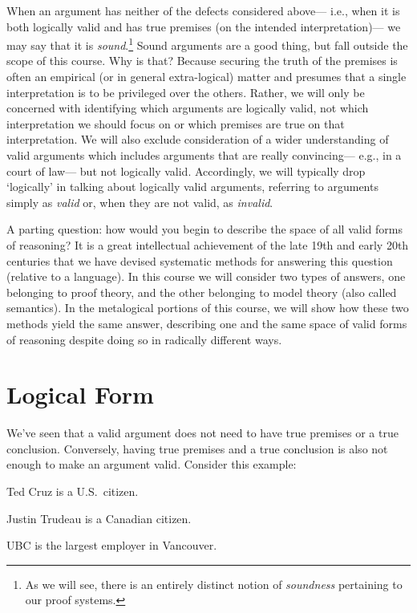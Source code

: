 When an argument has neither of the defects considered above--- i.e., when it is both logically valid and has true premises (on the intended interpretation)--- we may say that it is \textit{sound}.\footnote{As we will see, there is an entirely distinct notion of \textit{soundness} pertaining to our proof systems.}
Sound arguments are a good thing, but fall outside the scope of this course.
Why is that?
Because securing the truth of the premises is often an empirical (or in general extra-logical) matter and presumes that a single interpretation is to be privileged over the others.
Rather, we will only be concerned with identifying which arguments are logically valid, not which interpretation we should focus on or which premises are true on that interpretation.
We will also exclude consideration of a wider understanding of valid arguments which includes arguments that are really convincing--- e.g., in a court of law--- but not logically valid.
Accordingly, we will typically drop `logically' in talking about logically valid arguments, referring to arguments simply as \textit{valid} or, when they are not valid, as \textit{invalid}.

A parting question: how would you begin to describe the space of all valid forms of reasoning? 
It is a great intellectual achievement of the late 19th and early 20th centuries that we have devised systematic methods for answering this question (relative to a language).
In this course we will consider two types of answers, one belonging to proof theory, and the other belonging to model theory (also called semantics).
In the metalogical portions of this course, we will show how these two methods yield the same answer, describing one and the same space of valid forms of reasoning despite doing so in radically different ways.





\section{Logical Form}
\label{sec:LogicalForm}

We've seen that a valid argument does not need to have true premises or a true conclusion.
Conversely, having true premises and a true conclusion is also not enough to make an argument valid.
Consider this example:

\begin{earg}
  \item[] Ted Cruz is a U.S.\ citizen.
  \item[] Justin Trudeau is a Canadian citizen.
  \item[\therefore] UBC is the largest employer in Vancouver.
\end{earg}

